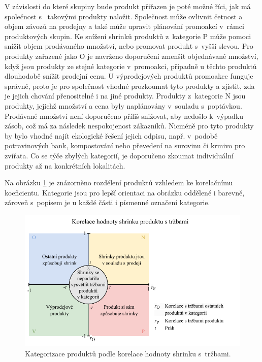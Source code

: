 V závislosti do které skupiny bude produkt přiřazen je poté možné říci, jak má společnost s~ takovými produkty naložit. Společnost může ovlivnit četnost a objem závozů na prodejny a také může upravit plánování promoakcí v~rámci produktových skupin. Ke snížení shrinků produktů z~kategorie P může pomoci snížit objem prodávaného množství, nebo promovat produkt s~vyšší slevou. Pro produkty zařazené jako O je navrženo doporučení zmenšit objednávané množství, když jsou produkty ze stejné kategorie v~promoakci, případně u těchto produktů dlouhodobě snížit prodejní cenu. U výprodejových produktů promoakce funguje správně, proto je pro společnost vhodné prozkoumat tyto produkty a zjistit, zda je jejich chování přenositelné i na jiné produkty. Produkty z~kategorie N jsou produkty, jejichž množství a cena byly naplánovány v~souladu s~poptávkou. Prodávané množství není doporučeno příliš snižovat, aby nedošlo k~výpadku zásob, což má za následek nespokojenost zákazníků. Nicméně pro tyto produkty by bylo vhodné najít ekologické řešení jejich odpisu, např. v~podobě potravinových bank, kompostování nebo převedení na surovinu či krmivo pro zvířata. Co se týče zbylých kategorií, je doporučeno zkoumat individuální produkty až na konkrétních lokalitách.

Na obrázku \ref*{obr:ctg:g:kategorizace1} je znázorněno rozdělení produktů vzhledem ke korelačnímu koeficientu. Kategorie jsou pro lepší orientaci na obrázku oddělené i barevně, zároveň s~popisem je u každé části i písmenné označení kategorie. 

\begin{figure}[hbtp!]
    \centering
    \captionsetup{justification=centering}
    \includegraphics[width=\textwidth]{obrazky/grafy/matice_korelace_typy_DP.pdf}
    \caption{Kategorizace produktů podle korelace hodnoty shrinku s~tržbami.}
    \label{obr:ctg:g:kategorizace1}
\end{figure}

